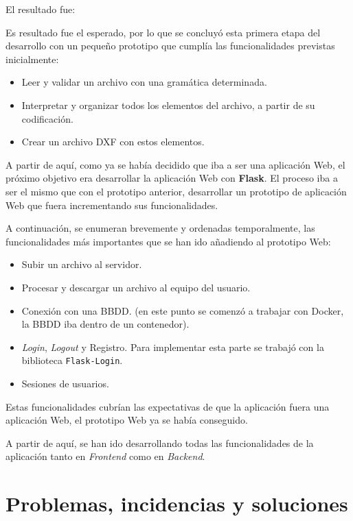 El resultado fue:



Es resultado fue el esperado, por lo que se concluyó esta primera etapa del desarrollo con un pequeño prototipo que cumplía las funcionalidades previstas inicialmente:

\begin{itemize}
\item Leer y validar un archivo con una gramática determinada.
\item Interpretar y organizar todos los elementos del archivo, a partir de su codificación.
\item Crear un archivo DXF con estos elementos.
\end{itemize}

A partir de aquí, como ya se había decidido que iba a ser una aplicación Web, el próximo objetivo era desarrollar la aplicación Web con \textbf{Flask}. El proceso iba a ser el mismo que con el prototipo anterior, desarrollar un prototipo de aplicación Web que fuera incrementando sus funcionalidades.

A continuación, se enumeran brevemente y ordenadas temporalmente, las funcionalidades más importantes que se han ido añadiendo al prototipo Web:
\begin{itemize}
\item Subir un archivo al servidor.
\item Procesar y descargar un archivo al equipo del usuario.
\item Conexión con una BBDD. (en este punto se comenzó a trabajar con Docker, la BBDD iba dentro de un contenedor).
\item \emph{Login}, \emph{Logout} y Registro. Para implementar esta parte se trabajó con la biblioteca \texttt{Flask-Login}.
\item Sesiones de usuarios. 
\end{itemize}

Estas funcionalidades cubrían las expectativas de que la aplicación fuera una aplicación Web, el prototipo Web ya se había conseguido.

A partir de aquí, se han ido desarrollando todas las funcionalidades de la aplicación tanto en \emph{Frontend} como en  \emph{Backend}.

\section{Problemas, incidencias y soluciones}

